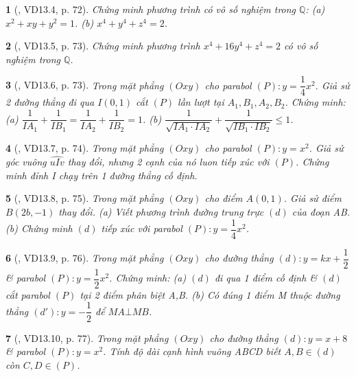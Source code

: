 \documentclass{article}
\newtheorem{baitoan}{}
\begin{document}
\begin{baitoan}[\cite{TLCT_THCS_Toan_9_dai_so}, VD13.4, p. 72]
	Chứng minh phương trình có vô số nghiệm trong $\mathbb{Q}$: (a) $x^2 + xy + y^2 = 1$. (b) $x^4 + y^4 + z^4 = 2$.
\end{baitoan}

\begin{baitoan}[\cite{TLCT_THCS_Toan_9_dai_so}, VD13.5, p. 73]
	Chứng minh phương trình $x^4 + 16y^4 + z^4 = 2$ có vô số nghiệm trong $\mathbb{Q}$.
\end{baitoan}

\begin{baitoan}[\cite{TLCT_THCS_Toan_9_dai_so}, VD13.6, p. 73]
	Trong mặt phẳng $(Oxy)$ cho parabol $(P):y = \dfrac{1}{4}x^2$. Giả sử 2 đường thẳng đi qua $I(0,1)$ cắt $(P)$ lần lượt tại $A_1,B_1,A_2,B_2$. Chứng minh: (a) $\dfrac{1}{IA_1} + \dfrac{1}{IB_1} = \dfrac{1}{IA_2} + \dfrac{1}{IB_2} = 1$. (b) $\dfrac{1}{\sqrt{IA_1\cdot IA_2}} + \dfrac{1}{\sqrt{IB_1\cdot IB_2}}\le1$.
\end{baitoan}

\begin{baitoan}[\cite{TLCT_THCS_Toan_9_dai_so}, VD13.7, p. 74]
	Trong mặt phẳng $(Oxy)$ cho parabol $(P):y = x^2$. Giả sử góc vuông $\widehat{uIv}$ thay đổi, nhưng 2 cạnh của nó luon tiếp xúc với $(P)$. Chứng minh đỉnh I chạy trên 1 đường thẳng cố định.
\end{baitoan}

\begin{baitoan}[\cite{TLCT_THCS_Toan_9_dai_so}, VD13.8, p. 75]
	Trong mặt phẳng $(Oxy)$ cho điểm $A(0,1)$. Giả sử điểm $B(2b,-1)$ thay đổi. (a) Viết phương trình đường trung trực $(d)$ của đoạn AB. (b) Chứng minh $(d)$ tiếp xúc với parabol $(P):y = \dfrac{1}{4}x^2$.
\end{baitoan}

\begin{baitoan}[\cite{TLCT_THCS_Toan_9_dai_so}, VD13.9, p. 76]
	Trong mặt phẳng $(Oxy)$ cho đường thẳng $(d):y = kx + \dfrac{1}{2}$ \& parabol $(P):y = \dfrac{1}{2}x^2$. Chứng minh: (a) $(d)$ đi qua 1 điểm cố định \& $(d)$ cắt parabol $(P)$ tại 2 điểm phân biệt A,B. (b) Có đúng 1 điểm M thuộc đường thẳng $(d'):y = -\dfrac{1}{2}$ để $MA\bot MB$.
\end{baitoan}

\begin{baitoan}[\cite{TLCT_THCS_Toan_9_dai_so}, VD13.10, p. 77]
	Trong mặt phẳng $(Oxy)$ cho đường thẳng $(d):y = x + 8$ \& parabol $(P):y = x^2$. Tính độ dài cạnh hình vuông ABCD biết $A,B\in(d)$ còn $C,D\in(P)$.
\end{baitoan}
\end{document}
